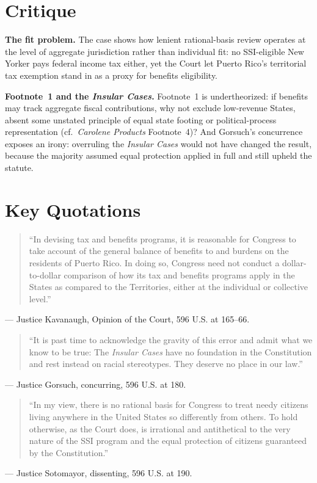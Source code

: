 \documentclass[12pt]{article}
\begin{document}
\section{Critique}

\textbf{The fit problem.} The case shows how lenient rational-basis review operates at the level of aggregate jurisdiction rather than individual fit: no SSI-eligible New Yorker pays federal income tax either, yet the Court let Puerto Rico's territorial tax exemption stand in as a proxy for benefits eligibility.

\textbf{Footnote~1 and the \textit{Insular Cases}.} Footnote~1 is undertheorized: if benefits may track aggregate fiscal contributions, why not exclude low-revenue States, absent some unstated principle of equal state footing or political-process representation (cf.\ \textit{Carolene Products} Footnote~4)? And Gorsuch's concurrence exposes an irony: overruling the \textit{Insular Cases} would not have changed the result, because the majority assumed equal protection applied in full and still upheld the statute.

\section{Key Quotations}

\begin{quote}
``In devising tax and benefits programs, it is reasonable for Congress to take account of the general balance of benefits to and burdens on the residents of Puerto Rico. In doing so, Congress need not conduct a dollar-to-dollar comparison of how its tax and benefits programs apply in the States as compared to the Territories, either at the individual or collective level.''
\end{quote}
\noindent --- Justice Kavanaugh, Opinion of the Court, 596 U.S. at 165--66.

\begin{quote}
``It is past time to acknowledge the gravity of this error and admit what we know to be true: The \emph{Insular Cases} have no foundation in the Constitution and rest instead on racial stereotypes. They deserve no place in our law.''
\end{quote}
\noindent --- Justice Gorsuch, concurring, 596 U.S. at 180.

\begin{quote}
``In my view, there is no rational basis for Congress to treat needy citizens living anywhere in the United States so differently from others. To hold otherwise, as the Court does, is irrational and antithetical to the very nature of the SSI program and the equal protection of citizens guaranteed by the Constitution.''
\end{quote}
\noindent --- Justice Sotomayor, dissenting, 596 U.S. at 190.
\end{document}
